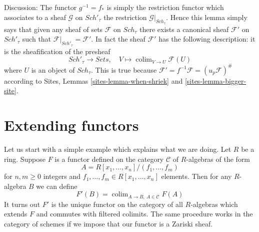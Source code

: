 \documentclass{stacks-project}
\theoremstyle{plain}
\theoremstyle{definition}
\theoremstyle{remark}
\numberwithin{equation}{subsection}
\def\colim{\mathop{\mathrm{colim}}\nolimits}
\def\Sch{\mathit{Sch}}
\begin{document}
\noindent
Discussion:
The functor $g^{-1} = f_*$ is simply the restriction functor which associates
to a sheaf $\mathcal{G}$ on $\Sch'_\tau$ the restriction
$\mathcal{G}|_{\Sch_\tau}$. Hence this lemma simply says that given
any sheaf of sets $\mathcal{F}$ on $\Sch_\tau$ there exists a
canonical sheaf $\mathcal{F}'$ on $\Sch'_\tau$ such that
$\mathcal{F}|_{\Sch'_\tau} = \mathcal{F}'$. In fact the sheaf
$\mathcal{F}'$ has the following description: it is the sheafification
of the presheaf
$$
\Sch'_\tau \longrightarrow \textit{Sets}, \quad
V \longmapsto \colim_{V \to U} \mathcal{F}(U)
$$
where $U$ is an object of $\Sch_\tau$. This is true because
$\mathcal{F}' = f^{-1}\mathcal{F} = (u_p\mathcal{F})^\#$ according to
Sites, Lemmas \ref{sites-lemma-when-shriek} and \ref{sites-lemma-bigger-site}.






\section{Extending functors}
\label{section-extending-functors}

\noindent
Let us start with a simple example which explains what we are doing.
Let $R$ be a ring. Suppose $F$ is a functor defined on the category
$\mathcal{C}$ of $R$-algebras of the form
$$
A = R[x_1, \ldots, x_n]/(f_1, \ldots, f_m)
$$
for $n, m \geq 0$ integers and $f_1, \ldots, f_m \in R[x_1, \ldots, x_n]$
elements. Then for any $R$-algebra $B$ we can define
$$
F'(B) = \colim_{A \to B,\ A \in \mathcal{C}} F(A)
$$
It turns out $F'$ is the unique functor on the category
of all $R$-algebras which extends $F$ and commutes with filtered
colimits. The same procedure works in the category of schemes
if we impose that our functor is a Zariski sheaf.
\end{document}
